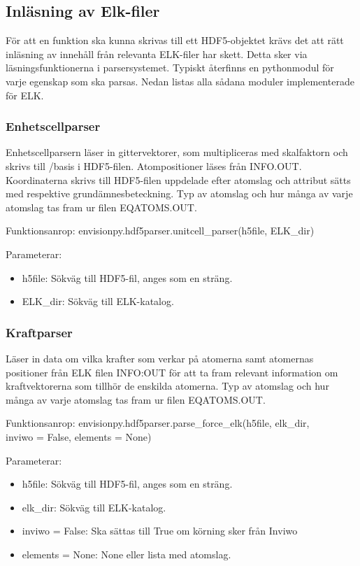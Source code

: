 \documentclass[10pt,oneside,swedish]{article}
\providecommand{\tightlist}{%
  \setlength{\itemsep}{0pt}\setlength{\parskip}{0pt}}
\begin{document}
\subsection{Inläsning av Elk-filer}
För att en funktion ska kunna skrivas till ett HDF5-objektet krävs det att rätt inläsning av innehåll från relevanta ELK-filer har skett. Detta sker via läsningsfunktionerna i parsersystemet. Typiskt återfinns en pythonmodul för varje egenskap som ska parsas. Nedan listas alla sådana moduler implementerade för ELK.

\subsubsection{Enhetscellparser}
Enhetscellparsern läser in gittervektorer, som multipliceras med skalfaktorn och skrivs till /basis i HDF5-filen. Atompositioner läses från INFO.OUT. Koordinaterna skrivs till HDF5-filen uppdelade efter atomslag och attribut sätts med respektive grundämnesbeteckning. Typ av atomslag och hur många av varje atomslag tas fram ur filen EQATOMS.OUT.

Funktionsanrop: envisionpy.hdf5parser.unitcell\_parser(h5file, ELK\_dir)

Parameterar:
\begin{itemize}
\tightlist
\item h5file: Sökväg till HDF5-fil, anges som en sträng.
\item ELK\_dir: Sökväg till ELK-katalog.
 
\end{itemize}

\subsubsection{Kraftparser}
Läser in data om vilka krafter som verkar på atomerna samt atomernas positioner från ELK filen INFO:OUT för att ta fram relevant information om kraftvektorerna som tillhör de enskilda atomerna. Typ av atomslag och hur många av varje atomslag tas fram ur filen EQATOMS.OUT.

Funktionsanrop: envisionpy.hdf5parser.parse\_force\_elk(h5file, elk\_dir, \\ inviwo = False, elements = None)

Parameterar:

\begin{itemize}
\tightlist
\item
  h5file: Sökväg till HDF5-fil, anges som en sträng.
\item
  elk\_dir: Sökväg till ELK-katalog.
\item
  inviwo = False: Ska sättas till True om körning sker från Inviwo
  
\item elements = None: None eller lista med atomslag.
\end{itemize}
\end{document}

